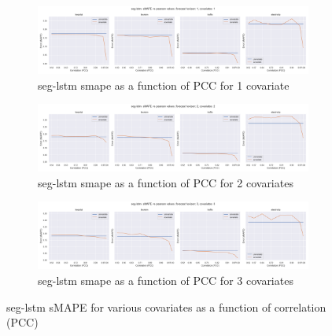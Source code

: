 \documentclass[letterpaper]{article}
\begin{document}
\begin{figure}[ht]
\begin{subfigure}{\textwidth}
\centering
\includegraphics[width=\textwidth]{figures/seg-lstm_k_1_smape_vs_pearson.png}
\caption{seg-lstm smape as a function of PCC for 1 covariate}
\label{fig:seg_lstm_k_1_smape_vs_pearson}
\end{subfigure}
\begin{subfigure}{\textwidth}
\centering
\includegraphics[width=\textwidth]{figures/seg-lstm_k_2_smape_vs_pearson.png}
\caption{seg-lstm smape as a function of PCC for 2 covariates}
\label{fig:seg_lstm_k_2_smape_vs_pearson}
\end{subfigure}
\begin{subfigure}{\textwidth}
\centering
\includegraphics[width=\textwidth]{figures/seg-lstm_k_3_smape_vs_pearson.png}
\caption{seg-lstm smape as a function of PCC for 3 covariates}
\label{fig:seg_lstm_k_3_smape_vs_pearson}
\end{subfigure}
\caption{seg-lstm sMAPE for various covariates as a function of correlation (PCC)}
\label{fig:seg_lstm_smape_vs_pearson}
\end{figure}
\end{document}
